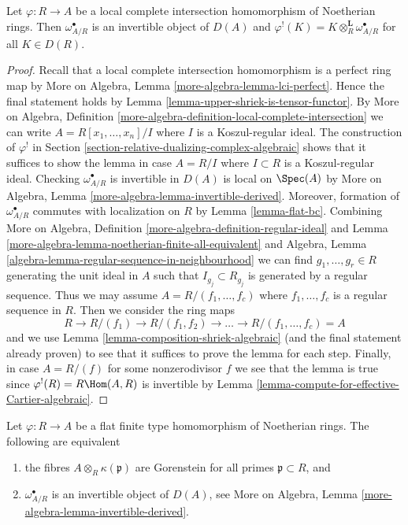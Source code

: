 \begin{lemma}
\label{lemma-lci-shriek}
Let $\varphi : R \to A$ be a local complete intersection homomorphism of
Noetherian rings. Then $\omega_{A/R}^\bullet$ is an invertible object of
$D(A)$ and $\varphi^!(K) = K \otimes_R^\mathbf{L} \omega_{A/R}^\bullet$
for all $K \in D(R)$.
\end{lemma}

\begin{proof}
Recall that a local complete intersection homomorphism is a perfect
ring map by More on Algebra, Lemma \ref{more-algebra-lemma-lci-perfect}.
Hence the final statement holds by
Lemma \ref{lemma-upper-shriek-is-tensor-functor}.
By More on Algebra, Definition
\ref{more-algebra-definition-local-complete-intersection}
we can write $A = R[x_1, \ldots, x_n]/I$ where $I$ is a
Koszul-regular ideal.
The construction of $\varphi^!$ in
Section \ref{section-relative-dualizing-complex-algebraic}
shows that it suffices to show the lemma in case
$A = R/I$ where $I \subset R$ is a Koszul-regular ideal.
Checking $\omega_{A/R}^\bullet$ is invertible in $D(A)$
is local on $\Spec(A)$ by More on Algebra, Lemma
\ref{more-algebra-lemma-invertible-derived}.
Moreover, formation of $\omega_{A/R}^\bullet$ commutes with
localization on $R$ by Lemma \ref{lemma-flat-bc}.
Combining
More on Algebra, Definition \ref{more-algebra-definition-regular-ideal} and
Lemma \ref{more-algebra-lemma-noetherian-finite-all-equivalent} and
Algebra, Lemma \ref{algebra-lemma-regular-sequence-in-neighbourhood}
we can find $g_1, \ldots, g_r \in R$ generating the unit ideal in $A$
such that $I_{g_j} \subset R_{g_j}$ is generated by a regular sequence.
Thus we may assume $A = R/(f_1, \ldots, f_c)$ where $f_1, \ldots, f_c$
is a regular sequence in $R$. Then we consider the ring maps
$$
R \to R/(f_1) \to R/(f_1, f_2) \to \ldots \to R/(f_1, \ldots, f_c) = A
$$
and we use Lemma \ref{lemma-composition-shriek-algebraic}
(and the final statement already proven)
to see that it suffices to prove the lemma for each step.
Finally, in case $A = R/(f)$ for some nonzerodivisor $f$
we see that the lemma is true since $\varphi^!(R) = R\Hom(A, R)$
is invertible by Lemma \ref{lemma-compute-for-effective-Cartier-algebraic}.
\end{proof}

\begin{lemma}
\label{lemma-gorenstein-shriek}
Let $\varphi : R \to A$ be a flat finite type homomorphism of Noetherian rings.
The following are equivalent
\begin{enumerate}
\item the fibres $A \otimes_R \kappa(\mathfrak p)$ are Gorenstein
for all primes $\mathfrak p \subset R$, and
\item $\omega_{A/R}^\bullet$ is an invertible object of $D(A)$, see
More on Algebra, Lemma \ref{more-algebra-lemma-invertible-derived}.
\end{enumerate}
\end{lemma}

